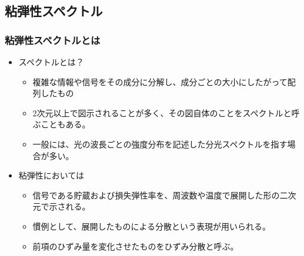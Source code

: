 \documentclass[12pt, dvipdfmx]{beamer}
\begin{document}
\subsection{粘弾性スペクトル}
\begin{frame}
	\frametitle{粘弾性スペクトルとは}
	\begin{itemize}
		\item スペクトルとは？
		\begin{itemize}
			\item 複雑な情報や信号をその成分に分解し、成分ごとの大小にしたがって配列したもの
			\item 2次元以上で図示されることが多く、その図自体のことをスペクトルと呼ぶこともある。
			\item 一般には、光の波長ごとの強度分布を記述した分光スペクトルを指す場合が多い。
		\end{itemize}
		\item 粘弾性においては
		\begin{itemize}
			\item 信号である貯蔵および損失弾性率を、周波数や温度で展開した形の二次元で示される。
			\item 慣例として、展開したものによる分散という表現が用いられる。
			\item 前項のひずみ量を変化させたものをひずみ分散と呼ぶ。
		\end{itemize}
	\end{itemize}
\end{frame}
\end{document}
